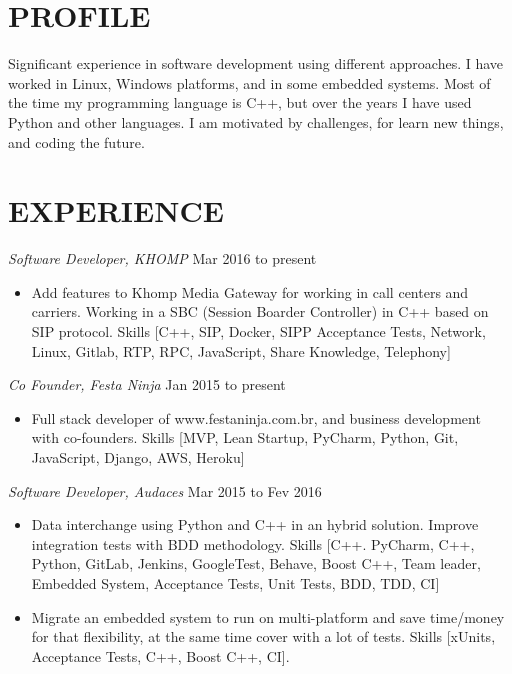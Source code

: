 \documentclass[line,margin]{res}
\begin{document}
\address{alvarofleith@gmail.com or +64 (09) 889-3534}
\address{https://linkedin.com/in/alvarofleith}


\begin{resume}

\section{PROFILE}       Significant experience in software development using different approaches. I have worked in Linux, Windows platforms, and in some embedded systems. Most of the time my programming language is C++, but over the years I have used Python and other languages. I am motivated by challenges, for learn new things, and coding the future.


 \section{EXPERIENCE} {\sl Software Developer, KHOMP} \hfill Mar 2016 to present \\
                 \begin{itemize}  \itemsep -2pt
                 \item Add features to Khomp Media Gateway for working in call centers and carriers. Working in a SBC (Session Boarder Controller) in C++ based on SIP protocol. Skills [C++, SIP, Docker, SIPP Acceptance Tests, Network, Linux, Gitlab, RTP, RPC, JavaScript, Share Knowledge, Telephony]
                \end{itemize}

                {\sl Co Founder, Festa Ninja} \hfill Jan 2015 to present \\
                 \begin{itemize}  \itemsep -2pt
                 \item Full stack developer of www.festaninja.com.br, and business development with co-founders. Skills [MVP, Lean Startup, PyCharm, Python, Git, JavaScript, Django, AWS, Heroku]
                 \end{itemize}

                {\sl Software Developer, Audaces} \hfill Mar 2015 to Fev 2016 \\
                  \begin{itemize}
                    \item Data interchange using Python and C++ in an hybrid solution. Improve integration tests with BDD methodology. Skills [C++. PyCharm, C++, Python, GitLab, Jenkins, GoogleTest, Behave, Boost C++, Team leader, Embedded System, Acceptance Tests, Unit Tests, BDD, TDD, CI]
                    \item Migrate an embedded system to run on multi-platform and save time/money for that flexibility, at the same time cover with a lot of tests. Skills [xUnits, Acceptance Tests, C++, Boost C++, CI].
                   \end{itemize}


\end{resume}
\end{document}
